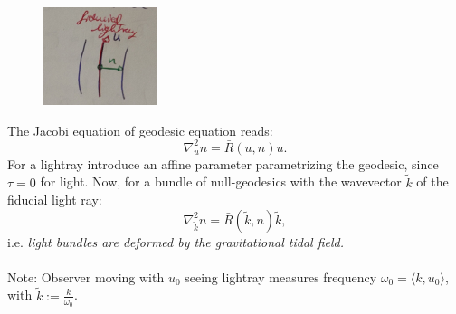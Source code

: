 \begin{figure}
	\centering
	\includegraphics[width=0.7\linewidth]{gfx/gravlensingLightcongruence}
	\caption{}
	\label{fig:gravlensinglightcongruence}
\end{figure}
The Jacobi equation of geodesic equation reads:
\begin{equation}
\nabla^2_u n = \bar{R}(u,n)u.
\end{equation}
For a lightray introduce an affine parameter parametrizing the geodesic, since $\tau=0$ for light. Now, for a bundle of null-geodesics with the wavevector $\tilde{k}$ of the fiducial light ray:
\begin{equation}
\nabla^2_{\tilde{k}} n = \bar{R}(\tilde{k},n)\tilde{k},
\end{equation}
i.e. \emph{light bundles are deformed by the gravitational tidal field.}\\
\\
Note: Observer moving with $u_0$ seeing lightray measures frequency $\omega_0=\langle k, u_0 \rangle$, with $\tilde{k}:= \frac{k}{\omega_0}$.\\
\\
